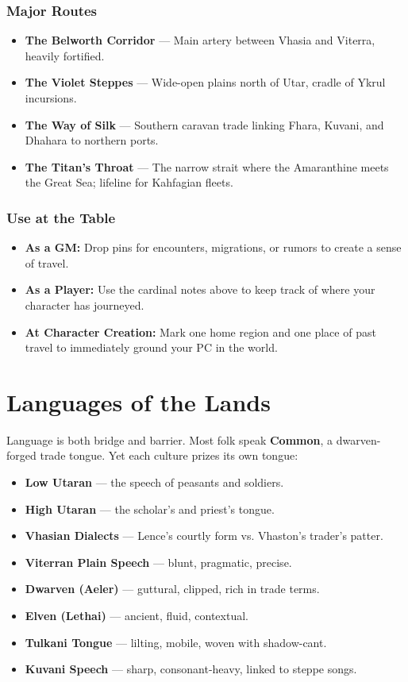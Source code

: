 \documentclass[11pt]{book}
\begin{document}
\subsection*{Major Routes}
\begin{itemize}
  \item \textbf{The Belworth Corridor} — Main artery between Vhasia and Viterra, heavily fortified.  
  \item \textbf{The Violet Steppes} — Wide-open plains north of Utar, cradle of Ykrul incursions.  
  \item \textbf{The Way of Silk} — Southern caravan trade linking Fhara, Kuvani, and Dhahara to northern ports.  
  \item \textbf{The Titan’s Throat} — The narrow strait where the Amaranthine meets the Great Sea; lifeline for Kahfagian fleets.  
\end{itemize}

\subsection*{Use at the Table}
\begin{itemize}
  \item \textbf{As a GM:} Drop pins for encounters, migrations, or rumors to create a sense of travel.  
  \item \textbf{As a Player:} Use the cardinal notes above to keep track of where your character has journeyed.  
  \item \textbf{At Character Creation:} Mark one home region and one place of past travel to immediately ground your PC in the world.  
\end{itemize}


\chapter{Languages of the Lands}
Language is both bridge and barrier. Most folk speak \textbf{Common}, a dwarven-forged trade tongue. 
Yet each culture prizes its own tongue:
\begin{itemize}
  \item \textbf{Low Utaran} — the speech of peasants and soldiers.  
  \item \textbf{High Utaran} — the scholar’s and priest’s tongue.  
  \item \textbf{Vhasian Dialects} — Lence’s courtly form vs. Vhaston’s trader’s patter.  
  \item \textbf{Viterran Plain Speech} — blunt, pragmatic, precise.  
  \item \textbf{Dwarven (Aeler)} — guttural, clipped, rich in trade terms.  
  \item \textbf{Elven (Lethai)} — ancient, fluid, contextual.  
  \item \textbf{Tulkani Tongue} — lilting, mobile, woven with shadow-cant.  
  \item \textbf{Kuvani Speech} — sharp, consonant-heavy, linked to steppe songs.  
\end{itemize}
\end{document}
